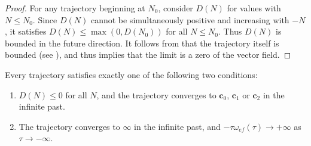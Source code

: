 \begin{proof}
For any trajectory beginning at $N_{0}$, consider $D(N)$ for values with $N\leq N_{0}$. Since $D(N)$ cannot be simultaneously positive and increasing with $-N$, it satisfies $D(N)\leq\max(0,D(N_{0}))$ for all $N\leq N_{0}$. Thus $D(N)$ is bounded in the future direction. It follows from  that the trajectory itself is bounded (see ), and thus  implies that the limit is a zero of the vector field. 
\end{proof}
%
\begin{lem}
\label{lem:dichotomy}Every trajectory satisfies exactly one of the following two conditions:
\begin{enumerate}
\item \label{enu:bounded-traj}$D(N)\leq0$ for all $N$, and the trajectory converges to $\mathbf{c}_{0}$, $\mathbf{c}_{1}$ or $\mathbf{c}_{2}$ in the infinite past.
\item \label{enu:conv-to-inf}The trajectory converges to $\bm{\infty}$ in the infinite past, and $-\tau\omega_{ef}(\tau)\to+\infty$ as $\tau\to-\infty$.
\end{enumerate}
\end{lem}

